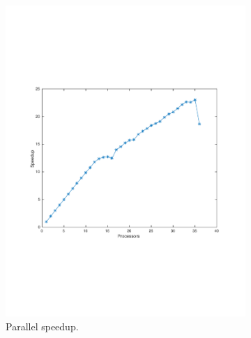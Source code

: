 \begin{figure}[h]
        \centering
        \begin{subfigure}[b]{0.45\textwidth}
			\includegraphics[width=\textwidth]{./figures/speedup}
			\caption{Parallel speedup.}
			\label{fig:speedup}
        \end{subfigure}
        ~ %
        \begin{subfigure}[b]{0.45\textwidth}

\end{subfigure}
\end{figure}
